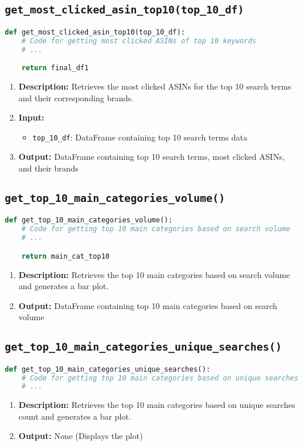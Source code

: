 \subsection{\texttt{get\_most\_clicked\_asin\_top10(top\_10\_df)}}
\begin{lstlisting}[language=Python]
def get_most_clicked_asin_top10(top_10_df):
    # Code for getting most clicked ASINs of top 10 keywords
    # ...

    return final_df1
\end{lstlisting}
\begin{enumerate}
    \item \textbf{Description:} Retrieves the most clicked ASINs for the top 10 search terms and their corresponding brands.
    \item \textbf{Input:}
          \begin{itemize}
              \item \texttt{top\_10\_df}: DataFrame containing top 10 search terms data
          \end{itemize}
    \item \textbf{Output:} DataFrame containing top 10 search terms, most clicked ASINs, and their brands
\end{enumerate}

\subsection{\texttt{get\_top\_10\_main\_categories\_volume()}}
\begin{lstlisting}[language=Python]
def get_top_10_main_categories_volume():
    # Code for getting top 10 main categories based on search volume
    # ...

    return main_cat_top10
\end{lstlisting}
\begin{enumerate}
    \item \textbf{Description:} Retrieves the top 10 main categories based on search volume and generates a bar plot.
    \item \textbf{Output:} DataFrame containing top 10 main categories based on search volume
\end{enumerate}

\subsection{\texttt{get\_top\_10\_main\_categories\_unique\_searches()}}
\begin{lstlisting}[language=Python]
def get_top_10_main_categories_unique_searches():
    # Code for getting top 10 main categories based on unique searches count
    # ...

\end{lstlisting}
\begin{enumerate}
    \item \textbf{Description:} Retrieves the top 10 main categories based on unique searches count and generates a bar plot.
    \item \textbf{Output:} None (Displays the plot)
\end{enumerate}

